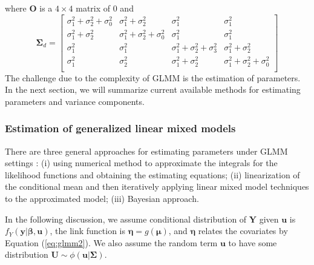 	where $\bm O$ is a $4\times 4$ matrix of 0 and 
	\[
	\bm \Sigma_d = \left[
	\begin{array}{cccc}
	\sigma^2_1+ \sigma^2_2 + \sigma^2_0  & \sigma^2_1+\sigma^2_2 & \sigma^2_1 &\sigma^2_1\\
	\sigma^2_1+\sigma^2_2 & \sigma^2_1 +\sigma^2_2 +\sigma^2_0 &\sigma^2_1 &\sigma^2_1\\
	\sigma^2_1 & \sigma^2_1& \sigma^2_1+\sigma^2_2+\sigma^2_3 & \sigma^2_1 + \sigma^2_2\\
	\sigma^2_1 &\sigma^2_2 &\sigma^2_1 +\sigma^2_2 & \sigma^2_1 +\sigma^2_2 +\sigma^2_0\\
	\end{array}
	\right]
	\]
	The challenge due to the complexity of GLMM is the estimation of parameters. In the next section, we will summarize current available methods for estimating parameters and variance components.
	
	\subsubsection{Estimation of generalized linear mixed models}\label{subsub:estimation}	
	There are three general approaches for estimating parameters under GLMM settings \citep[Chapter 7]{myers2012generalized}: (i) using numerical method to approximate the integrals for the likelihood functions and obtaining the estimating equations; (ii) linearization of the conditional mean and then iteratively applying linear mixed model techniques to the approximated model; (iii) Bayesian approach.  
	
	In the following discussion, we assume conditional distribution of $\bm Y$ given $\bm u$ is $f_{Y}(\bm y|\bm \beta, \bm u)$, the link function is $\bm \eta = g(\bm \mu)$, and $\bm \eta$ relates the covariates by Equation (\ref{eq:glmm2}). We also assume the random term $\bm u$ to have some distribution $\bm U \sim \phi(\bm u|\bm \Sigma)$. 	

